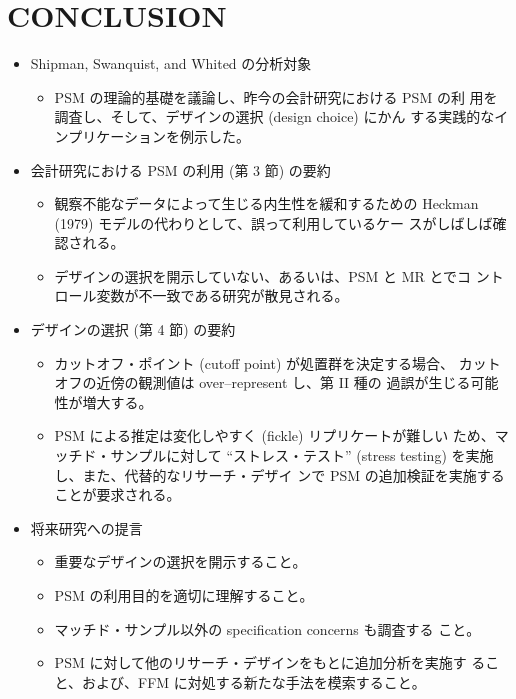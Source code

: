 \section{CONCLUSION}

\begin{itemize}
 \item Shipman, Swanquist, and Whited の分析対象
       \begin{itemize}
        \item PSM の理論的基礎を議論し、昨今の会計研究における PSM の利
              用を調査し、そして、デザインの選択 (design choice) にかん
              する実践的なインプリケーションを例示した。
       \end{itemize}
 \item 会計研究における PSM の利用 (第 3 節) の要約
       \begin{itemize}
        \item 観察不能なデータによって生じる内生性を緩和するための
              Heckman (1979) モデルの代わりとして、誤って利用しているケー
              スがしばしば確認される。
        \item デザインの選択を開示していない、あるいは、PSM と MR とでコ
              ントロール変数が不一致である研究が散見される。
       \end{itemize}
 \item デザインの選択 (第 4 節) の要約
       \begin{itemize}
        \item カットオフ・ポイント (cutoff point) が処置群を決定する場合、
              カットオフの近傍の観測値は over--represent し、第 II 種の
              過誤が生じる可能性が増大する。
        \item PSM による推定は変化しやすく (fickle) リプリケートが難しい
              ため、マッチド・サンプルに対して ``ストレス・テスト''
              (stress testing) を実施し、また、代替的なリサーチ・デザイ
              ンで PSM の追加検証を実施することが要求される。
       \end{itemize}
 \item 将来研究への提言
       \begin{itemize}
        \item 重要なデザインの選択を開示すること。
        \item PSM の利用目的を適切に理解すること。
        \item マッチド・サンプル以外の specification concerns も調査する
              こと。
        \item PSM に対して他のリサーチ・デザインをもとに追加分析を実施す
              ること、および、FFM に対処する新たな手法を模索すること。
       \end{itemize}
\end{itemize}
